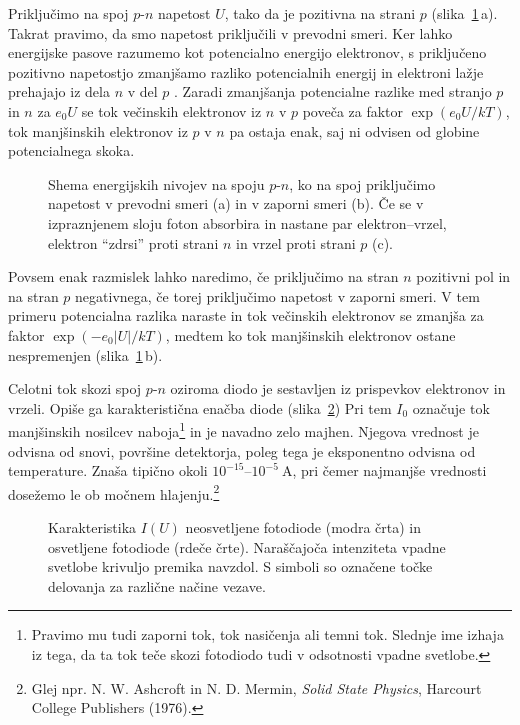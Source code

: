 Priključimo na spoj $p$-$n$ napetost $U$, tako da je pozitivna na strani $p$ (slika~\ref{11_PNU}\,a). 
Takrat pravimo, da smo napetost priključili v prevodni smeri.
Ker lahko energijske pasove razumemo kot potencialno energijo elektronov, 
s priključeno pozitivno napetostjo zmanjšamo razliko potencialnih energij 
in elektroni lažje prehajajo iz dela $n$ v del $p$ . 
Zaradi zmanjšanja potencialne razlike med stranjo $p$ in $n$ za $e_0U$ se tok 
večinskih elektronov iz $n$ v $p$ poveča za faktor $\exp(e_0 U/kT)$, tok manjšinskih elektronov
iz $p$ v $n$ pa ostaja enak, saj ni odvisen od globine potencialnega skoka. 
\begin{figure}[h]
\centering
\def\svgwidth{140truemm} 

\caption{Shema energijskih nivojev na spoju $p$-$n$, ko na spoj priključimo napetost
v prevodni smeri (a) in v zaporni smeri (b). Če se v izpraznjenem sloju foton absorbira 
in nastane par elektron--vrzel, elektron ``zdrsi'' proti strani $n$ in vrzel proti
strani $p$ (c).}
\label{11_PNU}
\end{figure}

Povsem enak razmislek lahko naredimo, če priključimo 
na stran $n$ pozitivni pol in na stran $p$ negativnega, če torej priključimo
napetost v zaporni smeri. V tem primeru potencialna razlika naraste in tok 
večinskih elektronov se zmanjša za faktor $\exp(-e_0 |U|/kT)$, medtem ko tok 
manjšinskih elektronov ostane nespremenjen (slika~\ref{11_PNU}\,b).

Celotni tok skozi spoj $p$-$n$ oziroma diodo je sestavljen iz prispevkov elektronov in vrzeli. Opiše ga
karakteristična enačba diode (slika~\ref{11_IU})
Pri tem $I_0$ označuje tok manjšinskih nosilcev naboja\footnote{Pravimo
mu tudi zaporni tok, tok nasičenja ali temni tok. Slednje ime izhaja iz tega, da
ta tok teče skozi fotodiodo tudi v odsotnosti vpadne svetlobe.}
in je navadno zelo majhen. Njegova vrednost je odvisna od snovi, površine
detektorja, poleg tega je eksponentno odvisna od temperature. Znaša 
tipično okoli $10^{-15}$--$10^{-5}~\si{\ampere}$, pri čemer najmanjše
vrednosti dosežemo le ob močnem hlajenju.\footnote{Glej npr. N. W. Ashcroft in 
N. D. Mermin, {\it Solid State Physics}, Harcourt College
Publishers (1976).}

\begin{figure}[h]
\centering
\def\svgwidth{100truemm} 

\caption{Karakteristika $I(U)$  neosvetljene fotodiode (modra črta)
in osvetljene fotodiode (rdeče črte). Naraščajoča intenziteta vpadne svetlobe
krivuljo premika navzdol. S simboli so označene točke delovanja za različne načine vezave.}
\label{11_IU}
\end{figure}
 
